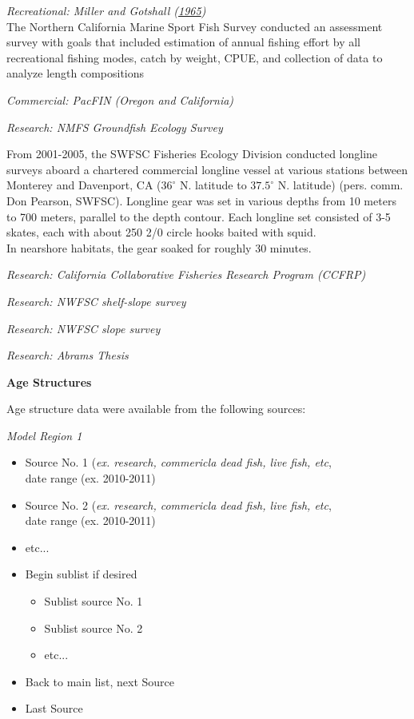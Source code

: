 \documentclass[12pt,]{article}
\begin{document}
\emph{Recreational: Miller and Gotshall
(\protect\hyperlink{ref-Miller1965}{1965})}\\
The Northern California Marine Sport Fish Survey conducted an assessment
survey with goals that included estimation of annual fishing effort by
all recreational fishing modes, catch by weight, CPUE, and collection of
data to analyze length compositions

\emph{Commercial: PacFIN (Oregon and California)}

\emph{Research: NMFS Groundfish Ecology Survey}

From 2001-2005, the SWFSC Fisheries Ecology Division conducted longline
surveys aboard a chartered commercial longline vessel at various
stations between Monterey and Davenport, CA (\(36^\circ\) N. latitude to
\(37.5^\circ\) N. latitude) (pers. comm. Don Pearson, SWFSC). Longline
gear was set in various depths from 10 meters to 700 meters, parallel to
the depth contour. Each longline set consisted of 3-5 skates, each with
about 250 2/0 circle hooks baited with squid.\\
In nearshore habitats, the gear soaked for roughly 30 minutes.

\emph{Research: California Collaborative Fisheries Research Program
(CCFRP)}

\emph{Research: NWFSC shelf-slope survey}

\emph{Research: NWFSC slope survey}

\emph{Research: Abrams Thesis}

\vspace{.5cm}

\textbf{Age Structures}

Age structure data were available from the following sources:

\emph{Model Region 1}

\begin{itemize}[noitemsep,nolistsep,topsep=0pt]
  \item Source No. 1 (\emph{ex. research, commericla dead fish, live fish, etc},\\ 
        date range (ex. 2010-2011)
  \item Source No. 2 (\emph{ex. research, commericla dead fish, live fish, etc},\\
        date range (ex. 2010-2011) 
  \item etc...      
  \item Begin sublist if desired 
    \begin{itemize}[noitemsep,nolistsep]
      \item Sublist source No. 1     
      \item Sublist source No. 2        
      \item etc...     
    \end{itemize}
  \item Back to main list, next Source     
  \item Last Source     
\end{itemize}
\end{document}
